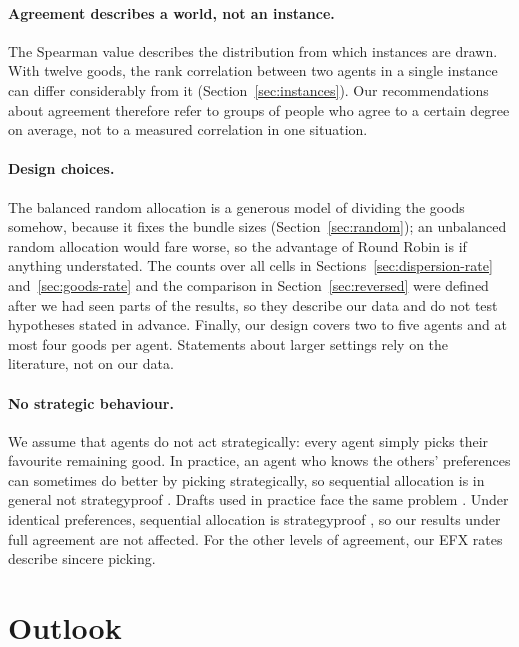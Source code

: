\paragraph{Agreement describes a world, not an instance.}
The Spearman value describes the distribution from which instances are drawn. With twelve goods,
the rank correlation between two agents in a single instance can differ considerably from it
(Section~\ref{sec:instances}). Our recommendations about agreement therefore refer to groups of
people who agree to a certain degree on average, not to a measured correlation in one situation.

\paragraph{Design choices.}
The balanced random allocation is a generous model of dividing the goods somehow, because it fixes
the bundle sizes (Section~\ref{sec:random}); an unbalanced random allocation would fare worse, so
the advantage of Round Robin is if anything understated. The counts over all cells in Sections~\ref{sec:dispersion-rate} and~\ref{sec:goods-rate} and
the comparison in Section~\ref{sec:reversed} were defined after we had seen parts of the results,
so they describe our data and do not test hypotheses stated in advance. Finally, our design covers two to five agents and at most four goods per agent.
Statements about larger settings rely on the literature, not on our data.

\paragraph{No strategic behaviour.}
We assume that agents do not act strategically: every agent simply picks their favourite remaining
good. In practice, an agent who knows the
others' preferences can sometimes do better by picking strategically, so sequential allocation is
in general not strategyproof \parencite[Sec.~4]{bouveret2011}. Drafts used in practice face the
same problem \parencite[p.~1065]{budish2011}. Under identical preferences, sequential allocation is
strategyproof \parencite[Prop.~6]{bouveret2011}, so our results under full agreement are not
affected. For the other levels of agreement, our EFX rates describe sincere picking.

\section{Outlook}\label{sec:outlook}

